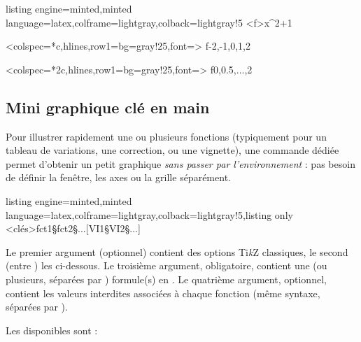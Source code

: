 \documentclass[11pt,a4paper]{ltxdoc}
\providecommand\tikzlogo{Ti\textit{k}Z}
\let\TikZ\tikzlogo
\begin{document}
\begin{tcblisting}{listing engine=minted,minted language=latex,colframe=lightgray,colback=lightgray!5}
\GenererFonction<f>{x^2+1}

\ConstruireTableauValeurs%
  [Arrondi=2]%
  <colspec={*{\tdvnbvals}{c}},hlines,row{1}={bg=gray!25,font=\bfseries}>%
  {f}{-2,-1,0,1,2}

\ConstruireTableauValeurs%
  [Arrondi=2,Presentation=V]%
  <colspec={*{2}{c}},hlines,row{1}={bg=gray!25,font=\bfseries}>%
  {f}{0,0.5,...,2}
\end{tcblisting}

\pagebreak

\subsection{Mini graphique \og clé en main \fg{}}\label{minigraphique}

Pour illustrer rapidement une ou plusieurs fonctions (typiquement pour un tableau de variations, une correction, ou une vignette), une commande dédiée permet d'obtenir un petit graphique \textit{sans passer par l'environnement}  : pas besoin de définir la fenêtre, les axes ou la grille séparément.

\begin{tcblisting}{listing engine=minted,minted language=latex,colframe=lightgray,colback=lightgray!5,listing only}
  <clés>{fct1§fct2§...}[VI1§VI2§...]
\end{tcblisting}

Le premier argument (optionnel) contient des options \TikZ{} classiques, le second (entre ) les  ci-dessous. Le troisième argument, obligatoire, contient une (ou plusieurs, séparées par ) formule(s)  en . Le quatrième argument, optionnel, contient les valeurs interdites associées à chaque fonction (même syntaxe, séparées par ).

\smallskip

Les  disponibles sont :
\end{document}
